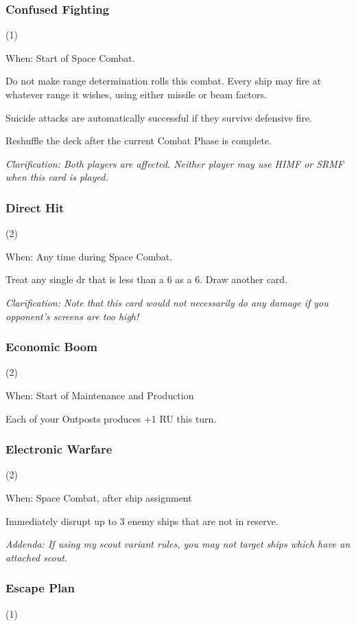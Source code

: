 \subsubsection{Confused Fighting} (1)

When: Start of Space Combat.

Do not make range determination rolls this combat. Every ship may fire at whatever range it wishes, using either missile or beam factors.

Suicide attacks are automatically successful if they survive defensive fire.

Reshuffle the deck after the current Combat Phase is complete.

\textit{Clarification: Both players are affected. Neither player may use HIMF or SRMF when this card is played.}

\subsubsection{Direct Hit} (2)

When: Any time during Space Combat.

Treat any single dr that is less than a 6 as a 6. Draw another card.

\textit{Clarification: Note that this card would not necessarily do any damage if you opponent's screens are too high!}

\subsubsection{Economic Boom} (2)

When: Start of Maintenance and Production

Each of your Outposts produces +1 RU this turn.

\subsubsection{Electronic Warfare} (2)

When: Space Combat, after ship assignment

Immediately disrupt up to 3 enemy ships that are not in reserve.

\textit{Addenda: If using my scout variant rules, you may not target ships which have an attached scout.}

\subsubsection{Escape Plan} (1)

